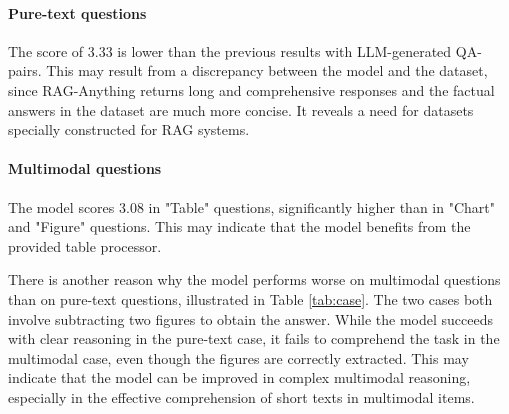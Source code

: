 \documentclass{article}
\begin{document}
  \paragraph{Pure-text questions}
  The score of 3.33 is lower than the previous results with LLM-generated QA-pairs.
  This may result from a discrepancy between the model and the dataset,
  since RAG-Anything returns long and comprehensive responses and the factual answers in the dataset are much more concise.
  It reveals a need for datasets specially constructed for RAG systems.

  \paragraph{Multimodal questions}
  The model scores 3.08 in "Table" questions, significantly higher than in "Chart" and "Figure" questions.
  This may indicate that the model benefits from the provided table processor.

  There is another reason why the model performs worse on multimodal questions than on pure-text questions,
  illustrated in Table \ref{tab:case}.
  The two cases both involve subtracting two figures to obtain the answer.
  While the model succeeds with clear reasoning in the pure-text case, it fails to comprehend the task in the multimodal case, even though the figures are correctly extracted.
  This may indicate that the model can be improved in complex multimodal reasoning,
  especially in the effective comprehension of short texts in multimodal items. 
\end{document}
